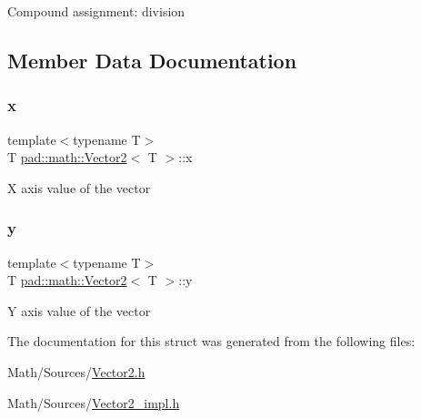 Compound assignment\+: division 

\subsection{Member Data Documentation}
\mbox{\label{structpad_1_1math_1_1_vector2_a3d4fc9deec4a8fd923ea4f5f73dfb763}} 
\subsubsection{\texorpdfstring{x}{x}}
{\footnotesize\ttfamily template$<$typename T$>$ \\
T \mbox{\hyperlink{structpad_1_1math_1_1_vector2}{pad\+::math\+::\+Vector2}}$<$ T $>$\+::x}

X axis value of the vector \mbox{\label{structpad_1_1math_1_1_vector2_a481eca28456d2e02f635059d379b89f5}} 
\subsubsection{\texorpdfstring{y}{y}}
{\footnotesize\ttfamily template$<$typename T$>$ \\
T \mbox{\hyperlink{structpad_1_1math_1_1_vector2}{pad\+::math\+::\+Vector2}}$<$ T $>$\+::y}

Y axis value of the vector 

The documentation for this struct was generated from the following files\+:\begin{DoxyCompactItemize}
\item 
Math/\+Sources/\mbox{\hyperlink{_vector2_8h}{Vector2.\+h}}\item 
Math/\+Sources/\mbox{\hyperlink{_vector2__impl_8h}{Vector2\+\_\+impl.\+h}}\end{DoxyCompactItemize}
